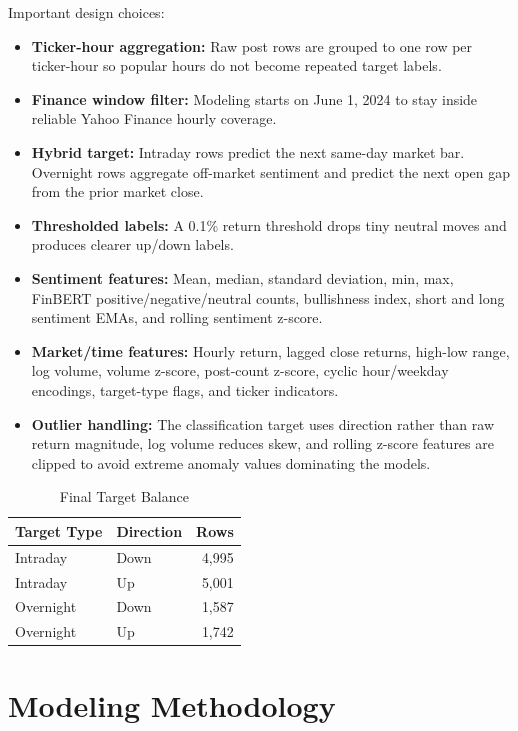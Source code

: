 \documentclass[11pt]{article}
\begin{document}
Important design choices:

\begin{itemize}
    \item \textbf{Ticker-hour aggregation:} Raw post rows are grouped to one row per ticker-hour so popular hours do not become repeated target labels.
    \item \textbf{Finance window filter:} Modeling starts on June 1, 2024 to stay inside reliable Yahoo Finance hourly coverage.
    \item \textbf{Hybrid target:} Intraday rows predict the next same-day market bar. Overnight rows aggregate off-market sentiment and predict the next open gap from the prior market close.
    \item \textbf{Thresholded labels:} A 0.1\% return threshold drops tiny neutral moves and produces clearer up/down labels.
    \item \textbf{Sentiment features:} Mean, median, standard deviation, min, max, FinBERT positive/negative/neutral counts, bullishness index, short and long sentiment EMAs, and rolling sentiment z-score.
    \item \textbf{Market/time features:} Hourly return, lagged close returns, high-low range, log volume, volume z-score, post-count z-score, cyclic hour/weekday encodings, target-type flags, and ticker indicators.
    \item \textbf{Outlier handling:} The classification target uses direction rather than raw return magnitude, log volume reduces skew, and rolling z-score features are clipped to avoid extreme anomaly values dominating the models.
\end{itemize}

\begin{table}[H]
\centering
\caption{Final Target Balance}
\begin{tabular}{llr}
\toprule
Target Type & Direction & Rows \\
\midrule
Intraday & Down & 4,995 \\
Intraday & Up & 5,001 \\
Overnight & Down & 1,587 \\
Overnight & Up & 1,742 \\
\bottomrule
\end{tabular}
\end{table}

\section{Modeling Methodology}
\end{document}
